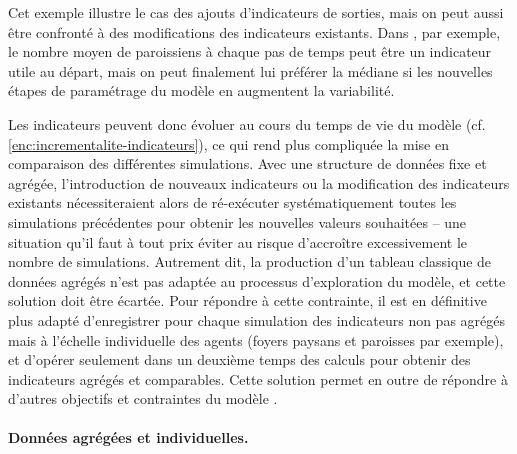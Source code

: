 Cet exemple illustre le cas des ajouts d'indicateurs de sorties, mais on peut aussi être confronté à des modifications des indicateurs existants.
Dans \simfeodal{}, par exemple, le nombre moyen de paroissiens à chaque pas de temps peut être un indicateur utile au départ, mais on peut finalement lui préférer la médiane si les nouvelles étapes de paramétrage du modèle en augmentent la variabilité.

Les indicateurs peuvent donc évoluer au cours du temps de vie du modèle (cf. \cref{enc:incrementalite-indicateurs}), ce qui rend plus compliquée la mise en comparaison des différentes simulations.
Avec une structure de données fixe et agrégée, l'introduction de nouveaux indicateurs ou la modification des indicateurs existants nécessiteraient alors de ré-exécuter systématiquement toutes les simulations précédentes pour obtenir les nouvelles valeurs souhaitées -- une situation qu'il faut à tout prix éviter au risque d'accroître excessivement le nombre de simulations.
Autrement dit, la production d'un tableau classique de données agrégés n'est pas adaptée au processus d'exploration du modèle, et cette solution doit être écartée.
Pour répondre à cette contrainte, il est en définitive plus adapté d'enregistrer pour chaque simulation des indicateurs non pas agrégés mais à l'échelle individuelle des agents (foyers paysans et paroisses par exemple), et d'opérer seulement dans un deuxième temps des calculs pour obtenir des indicateurs agrégés et comparables.
Cette solution permet en outre de répondre à d'autres objectifs et contraintes du modèle \simfeodal{}.


\paragraph{Données agrégées et individuelles.}


